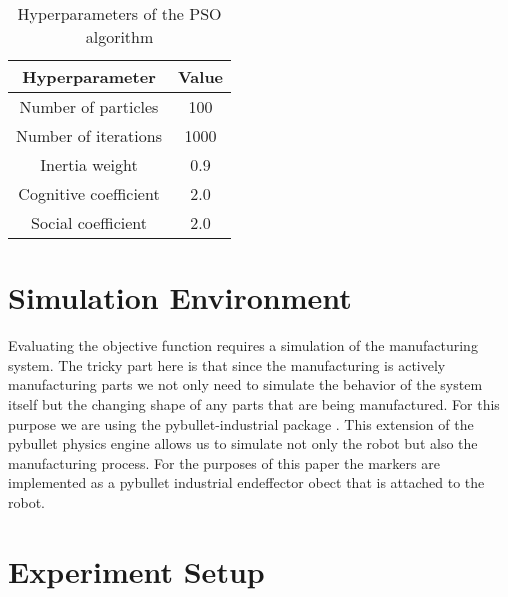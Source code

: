 \documentclass{svproc}
\begin{document}
\begin{table}  %
        \centering
        \begin{tabular}{c|c}
                Hyperparameter & Value \\
                \hline
                Number of particles & 100 \\
                Number of iterations & 1000 \\
                Inertia weight & 0.9 \\
                Cognitive coefficient & 2.0 \\
                Social coefficient & 2.0 \\
        \end{tabular}
        \caption{Hyperparameters of the PSO algorithm}
        \label{tab:hyperparameters}
\end{table}

\section{Simulation Environment}
Evaluating the objective function requires a simulation of the manufacturing system.
The tricky part here is that since the manufacturing is actively manufacturing parts we not only need to simulate the behavior of the system itself but the changing shape of any parts that are being manufactured.
For this purpose we are using the pybullet-industrial package \cite{pybullet_industrial}.
This extension of the pybullet physics engine allows us to simulate not only the robot but also the manufacturing process.
For the purposes of this paper the markers are implemented as a pybullet industrial endeffector obect that is attached to the robot.

\section{Experiment Setup}
\end{document}
